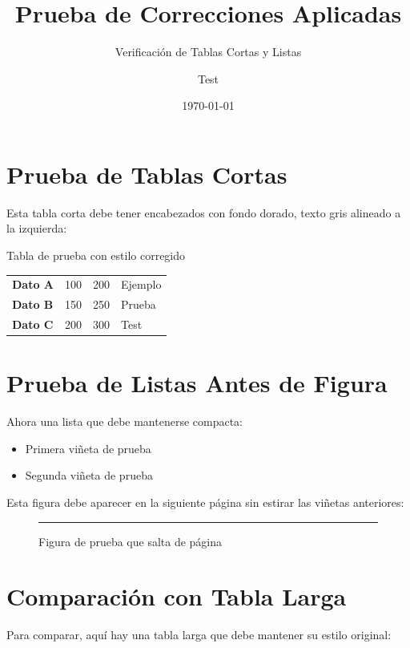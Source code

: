 \documentclass{sener2025}
\title{Prueba de Correcciones Aplicadas}
\subtitle{Verificación de Tablas Cortas y Listas}
\author{Test}
\date{\today}
\begin{document}
\section{Prueba de Tablas Cortas}

Esta tabla corta debe tener encabezados con fondo dorado, texto gris alineado a la izquierda:

\begin{tabladoradoCorto}
  \caption{Tabla de prueba con estilo corregido}
  \label{tab:prueba_corregida}
  \begin{tabular}{H{3cm}G{2cm}G{2cm}G{2cm}}
    \toprule
      &  &  &  \\
    \midrule
    \textbf{Dato A} & 100 & 200 & Ejemplo \\
    \textbf{Dato B} & 150 & 250 & Prueba \\
    \textbf{Dato C} & 200 & 300 & Test \\
    \bottomrule
  \end{tabular}
\end{tabladoradoCorto}

\section{Prueba de Listas Antes de Figura}

Ahora una lista que debe mantenerse compacta:

\begin{itemize}
  \item Primera viñeta de prueba
  \item Segunda viñeta de prueba
\end{itemize}

Esta figura debe aparecer en la siguiente página sin estirar las viñetas anteriores:

\begin{figure}[H]
  {\centering
  \rule{10cm}{8cm}
  \par}
  \raggedright
  \caption{Figura de prueba que salta de página}
  \label{fig:prueba_salto}
\end{figure}

\section{Comparación con Tabla Larga}

Para comparar, aquí hay una tabla larga que debe mantener su estilo original:
\end{document}
